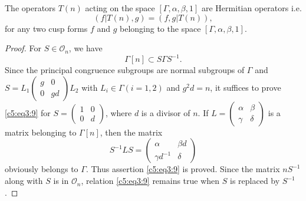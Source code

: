 \begin{thm}\label{chap5:thm41}
The operators $T(n)$ acting on the space $[\Gamma, \alpha,\beta,1]$ are
Hermitian operators i.e. 
$$
(f|T(n),g) =(f,g|T(n)),
$$
for any \pageoriginale two cusp forms $f$ and $g$ belonging to the
space $[\Gamma, \alpha,\beta,1]$. 
\end{thm}

\begin{proof}
For $S \in \mathscr{O}_n$, we have 
\begin{equation*}
\Gamma[n] \subset S \Gamma S^{-1}. \tag{9}\label{c5:eq3:9}
\end{equation*}
Since the principal congruence  subgroups are normal subgroups of
$\Gamma$ and $S =
L_1\left(\begin{smallmatrix} g&0\\0&gd \end{smallmatrix}\right)L_2$
with $L_i\in \Gamma(i=1,2)$ and $g^2d=n$, it suffices to prove
\eqref{c5:eq3:9} for $S=\left(\begin{smallmatrix}
  1&0\\0&d \end{smallmatrix}\right)$, where $d$ is a divisor of
$n$. If $L=\left(\begin{smallmatrix} \alpha &
  \beta\\\gamma&\delta \end{smallmatrix}\right)$ is a matrix belonging
to $\Gamma[n]$, then the matrix
$$
S^{-1} L S = \begin{pmatrix}
\alpha & \beta d\\
\gamma d^{-1} & \delta 
\end{pmatrix}
$$
obviously belongs to $\Gamma$. Thus assertion \eqref{c5:eq3:9} is proved. Since the
matrix $n S^{-1}$ along with $S$ is in $\mathcal{O}_n$, relation \eqref{c5:eq3:9}
remains true when $S$ is replaced by $S^{-1}$. 


\end{proof}

